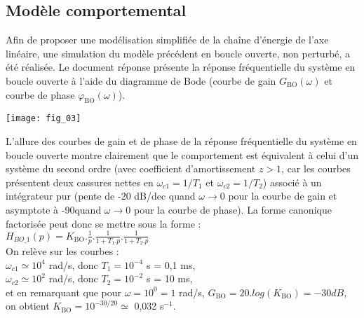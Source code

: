\subsection*{Modèle comportemental}

\ifprof
\else
Afin de proposer une modélisation simplifiée de la chaîne d'énergie de l'axe linéaire, une simulation du modèle précédent en boucle ouverte, non perturbé, a été réalisée. Le document réponse présente la réponse fréquentielle du système en boucle ouverte à l'aide du diagramme de Bode (courbe de gain $G_{\text{BO}}(\omega)$ et courbe de phase $\varphi_{\text{BO}}(\omega)$). 


\fi




\begin{marginfigure}
\texttt{[image: fig\_03]}
\end{marginfigure}


\ifprof
\begin{corrige}
L'allure des courbes de gain et de phase de la réponse fréquentielle du système en boucle ouverte montre clairement que le comportement est équivalent à celui d'un système du second ordre (avec coefficient d'amortissement $z>1$, car les courbes présentent deux cassures nettes en $\omega_{c1}=1/T_1$ et $\omega_{c2}=1/T_2$) associé à un intégrateur pur (pente de -20 dB/dec quand $\omega \rightarrow 0$ pour la courbe de gain et asymptote à -90\degre quand $\omega \rightarrow 0$ pour la courbe de phase). La forme canonique factorisée peut donc se mettre sous la forme : \\
$H_{BO\_1}(p) = K_{\text{BO}} . \frac{1}{p}. \frac{1}{1+T_1.p} . \frac{1}{1+T_2.p} $\\
On relève sur les courbes :\\
$\omega_{c1} \simeq 10^4$ rad/s, donc $T_1 = 10^{-4}$ s = 0,1 ms,\\
$\omega_{c2} \simeq 10^2$ rad/s, donc $T_2 = 10^{-2}$ s = 10 ms,\\
et en remarquant que pour $\omega = 10^0=1$ rad/s, $G_{\text{BO}}=20.log(K_{\text{BO}})= -30 dB$, on obtient $ K_{\text{BO}} = 10^{-30/20} \simeq $ 0,032 s$^{-1}$.
 \end{corrige}
\fi


